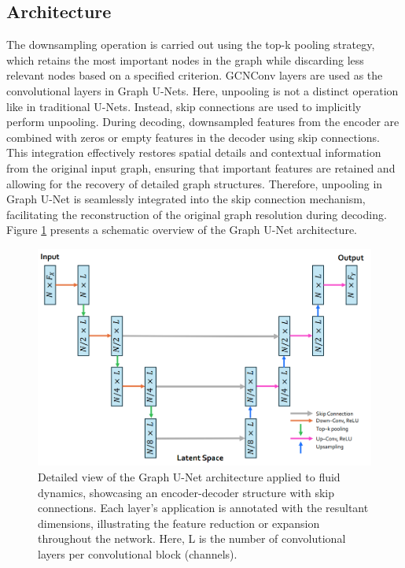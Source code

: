 \subsection{Architecture}
The downsampling operation is carried out using the top-k pooling strategy, which retains the most important nodes in the graph while discarding less relevant nodes based on a specified criterion. GCNConv layers are used as the convolutional layers in Graph U-Nets. Here, unpooling is not a distinct operation like in traditional U-Nets. Instead, skip connections are used to implicitly perform unpooling. During decoding, downsampled features from the encoder are combined with zeros or empty features in the decoder using skip connections. This integration effectively restores spatial details and contextual information from the original input graph, ensuring that important features are retained and allowing for the recovery of detailed graph structures. Therefore, unpooling in Graph U-Net is seamlessly integrated into the skip connection mechanism, facilitating the reconstruction of the original graph resolution during decoding. Figure \ref{fig:GraphUnet} presents a schematic overview of the Graph U-Net architecture. 
\begin{figure}[ht]
    \centering
    \includegraphics[width=12cm]{images/Methodology/GraphUNet.png}
    \caption{Detailed view of the Graph U-Net architecture applied to fluid dynamics, showcasing an encoder-decoder structure with skip connections. Each layer’s application is annotated with the resultant dimensions, illustrating the feature reduction or expansion throughout the network. Here, L is the number of convolutional layers per convolutional block (channels).}
    \label{fig:GraphUnet}
\end{figure}

